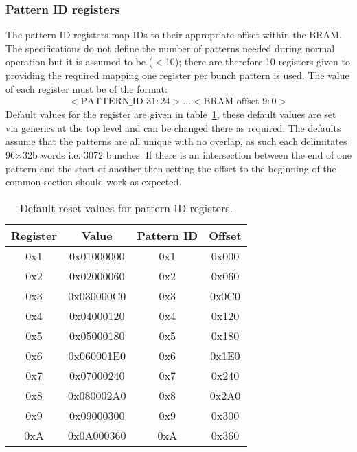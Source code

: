 \documentclass[]{article}
\begin{document}
  \subsubsection{Pattern ID registers} %
  \label{sub:pattern_id_registers}
  The pattern ID registers map IDs to their appropriate offset within the BRAM. The specifications do not define the number of patterns needed during normal operation but it is assumed to be (\( < \)10); there are therefore 10 registers given to providing the required mapping one register per bunch pattern is used. The value of each register must be of the format:
  \begin{align} \label{fmt:pattern_id}
    <\text{PATTERN\_ID } 31:24>\ldots<\text{BRAM offset } 9:0> 
  \end{align}
  Default values for the register are given in table~\ref{tab:default_pattern_id_reg}, these default values are set via generics at the top level and can be changed there as required. The defaults assume that the patterns are all unique with no overlap, as such each delimitates 96\( \times \)32b words i.e. 3072 bunches. If there is an intersection between the end of one pattern and the start of another then setting the offset to the beginning of the common section should work as expected.
  \begin{table}
    \begin{center}
    \begin{tabular}{c|c|c|c}
      Register & Value      & Pattern ID & Offset \\
      \hline
      0x1      & 0x01000000 & 0x1        & 0x000  \\ 
      0x2      & 0x02000060 & 0x2        & 0x060  \\  
      0x3      & 0x030000C0 & 0x3        & 0x0C0  \\ 
      0x4      & 0x04000120 & 0x4        & 0x120  \\ 
      0x5      & 0x05000180 & 0x5        & 0x180  \\ 
      0x6      & 0x060001E0 & 0x6        & 0x1E0  \\ 
      0x7      & 0x07000240 & 0x7        & 0x240  \\ 
      0x8      & 0x080002A0 & 0x8        & 0x2A0  \\ 
      0x9      & 0x09000300 & 0x9        & 0x300  \\ 
      0xA      & 0x0A000360 & 0xA        & 0x360  \\ 
    \end{tabular}
    \end{center}
    \caption{Default reset values for pattern ID registers.}
    \label{tab:default_pattern_id_reg}
  \end{table}
\end{document}
